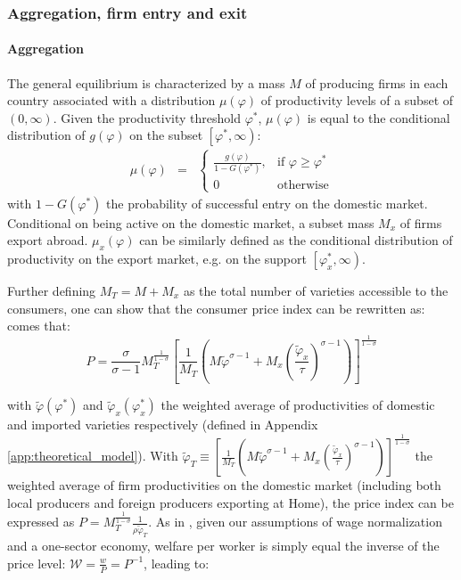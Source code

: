\documentclass[a4paper,11pt]{article}
\begin{document}
\subsubsection{Aggregation, firm entry and exit}

\paragraph{Aggregation} The general equilibrium is characterized by a mass $M$ of producing firms in each country associated with a distribution $\mu(\varphi)$ of productivity levels of a subset of $\left(0,\infty\right)$. Given the productivity threshold $\varphi^\ast$, $\mu(\varphi)$ is equal to the conditional distribution of $g(\varphi)$ on the subset $\left[\varphi^\ast, \infty\right)$:
\begin{eqnarray}
\mu(\varphi) &=& \left\{
\begin{array}{ll}
\frac{g(\varphi)}{1-G(\varphi^\ast)}, & \text{if } \varphi\geq \varphi^\ast  \\
0 & \text{otherwise}
\end{array}
\right.  \label{eq:muofphi}
\end{eqnarray}
\noindent with $1-G(\varphi^\ast)$ the probability of successful entry on the domestic market. Conditional on being active on the domestic market, a subset mass $M_x$ of firms export abroad. $\mu_x(\varphi)$ can be similarly defined as the conditional distribution of productivity on the export market, e.g. on the support $\left[ \varphi^\ast_x,\infty\right)$.


Further defining $M_T = M+M_x$ as the total number of varieties accessible to the consumers, one can show that the consumer price index can be rewritten as: comes that:
$$P = \frac{\sigma}{\sigma-1}M_T^{\frac{1}{1-\sigma}}\left[\frac{1}{M_T}\left(M\widetilde{\varphi}^{\sigma-1} + M_x \left( \frac{\widetilde{\varphi}_x}{\tau} \right)^{\sigma-1} \right)  \right]^{\frac{1}{1-\sigma}}$$

\noindent with $\widetilde{\varphi}(\varphi^\ast)$ and $\widetilde{\varphi}_x(\varphi_x^\ast)$ the weighted average of productivities of domestic and imported varieties respectively (defined in Appendix \ref{app:theoretical_model}). With $\widetilde{\varphi}_T \equiv \left[\frac{1}{M_T}\left(M\widetilde{\varphi}^{\sigma-1} + M_x \left( \frac{\widetilde{\varphi}_x}{\tau} \right)^{\sigma-1} \right)  \right]^{\frac{1}{1-\sigma}}$ the weighted average of firm productivities on the domestic market (including both local producers and foreign producers exporting at Home), the price index can be expressed as $P = M_T^{\frac{1}{1-\sigma}}\frac{1}{\rho \widetilde{\varphi}_T }$. As in \cite{melitz}, given our assumptions of wage normalization and a one-sector economy, welfare per worker is simply equal the inverse of the price level: $\mathcal{W} = \frac{w}{P}= P^{-1}$, leading to:
\end{document}
